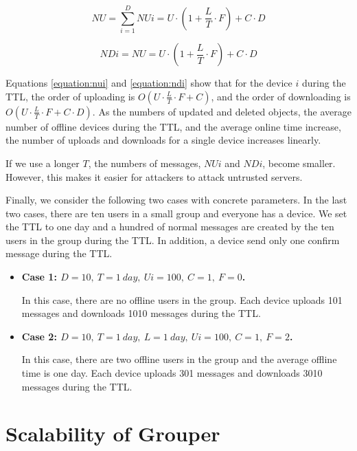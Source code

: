 \documentclass[a4paper,11pt]{report}
\begin{document}
\begin{equation}
NU = \sum_{i = 1}^{D} NUi = U \cdot (1 + \frac{L}{T} \cdot F) + C \cdot D
\label{equation:nu}
\end{equation}

\begin{equation}
NDi = NU = U \cdot (1 + \frac{L}{T} \cdot F) + C \cdot D
\label{equation:ndi}
\end{equation}

Equations \ref{equation:nui} and \ref{equation:ndi} show that for the device $i$ during the TTL, the order of uploading is $O(U \cdot \frac{L}{T} \cdot F + C)$, and the order of downloading is $O(U \cdot \frac{L}{T} \cdot F + C \cdot D)$.
As the numbers of updated and deleted objects, the average number of offline devices during the TTL, and the average online time increase, the number of uploads and downloads for a single device increases linearly.

If we use a longer $T$, the numbers of messages, $NUi$ and $NDi$, become smaller.
However, this makes it easier for attackers to attack untrusted servers.

Finally, we consider the following two cases with concrete parameters.
In the last two cases, there are ten users in a small group and everyone has a device.
We set the TTL to one day and a hundred of normal messages are created by the ten users in the group during the TTL.
In addition, a device send only one confirm message during the TTL.

\begin{itemize}[leftmargin=7mm]
	\setlength{\itemsep}{1pt}
	\setlength{\parskip}{0pt}
	\setlength{\parsep}{0pt}
	\item \textbf{Case 1: $D = 10,\ T = 1 \ day,\ Ui = 100,\ C = 1,\ F = 0$.}
	
	In this case, there are no offline users in the group.
	Each device uploads 101 messages and downloads 1010 messages during the TTL.
	\item \textbf{Case 2: $D = 10,\ T = 1 \ day,\ L = 1 \  day,\ Ui = 100,\ C = 1,\ F = 2$.} 
	
	In this case, there are two offline users in the group and the average offline time is one day.
	Each device uploads 301 messages and downloads 3010 messages during the TTL.
\end{itemize}

\section{Scalability of Grouper} \label{section:grouper_scalability}
\end{document}

